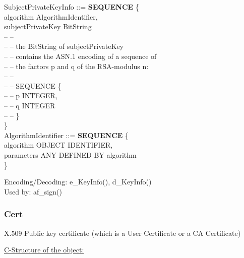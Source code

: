 {\small
\bvtab
\1 SubjectPrivateKeyInfo ::= \5 {\bf SEQUENCE} \{  \\
\7 algorithm         \2 AlgorithmIdentifier,    \\
\7 subjectPrivateKey BitString            \\
\7 -- -- \\
\7 -- -- the BitString of subjectPrivateKey   \\
\7 -- -- contains the ASN.1 encoding of a sequence of \\
\7 -- -- the factors p and q of the RSA-modulus n:   \\
\7 -- -- \\
\7 -- -- SEQUENCE \{ \\
\7 -- -- \2       p INTEGER,   \\
\7 -- -- \2       q INTEGER  \\
\7 -- -- \} \\
\6 \} \\
\evtab
\bvtab
\1 AlgorithmIdentifier ::= \5 {\bf SEQUENCE} \{    \\
\7 algorithm  \3 OBJECT IDENTIFIER, \\
\7 parameters \3 ANY DEFINED BY algorithm  \\
\6 \}
\evtab
}

Encoding/Decoding: e\_KeyInfo(), d\_KeyInfo() \\
Used by: af\_sign()


\subsubsection{Cert}
X.509 Public key certificate (which is a User Certificate or a CA Certificate) 

\underline{C-Structure of the object:}

